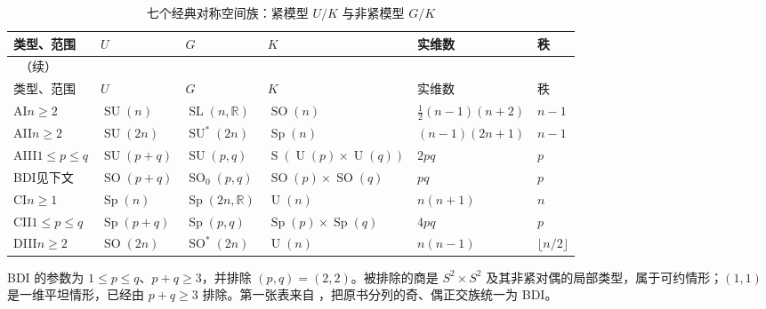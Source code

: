 \begingroup
\small
\setlength{\tabcolsep}{3pt}
\begin{longtable}{@{}p{}p{}p{}p{}p{}p{}@{}}
	\caption{七个经典对称空间族：紧模型 \(U/K\) 与非紧模型 \(G/K\)}\label{g3:tab:classical-symmetric-spaces}\\
	\toprule
	类型、范围 & \(U\) & \(G\) & \(K\) & 实维数 & 秩\\
	\midrule
	\endfirsthead
	\multicolumn{6}{l}{\thetable\ （续）}\\
	\toprule
	类型、范围 & \(U\) & \(G\) & \(K\) & 实维数 & 秩\\
	\midrule
	\endhead
	\bottomrule
	\endfoot
	AI\newline \(n\ge2\) & \(\operatorname{SU}(n)\) & \(\operatorname{SL}(n,\mathbb R)\) & \(\operatorname{SO}(n)\) & \(\tfrac12(n-1)(n+2)\) & \(n-1\)\\[3pt]
	AII\newline \(n\ge2\) & \(\operatorname{SU}(2n)\) & \(\operatorname{SU}^*(2n)\) & \(\operatorname{Sp}(n)\) & \((n-1)(2n+1)\) & \(n-1\)\\[3pt]
	AIII\newline \(1\le p\le q\) & \(\operatorname{SU}(p+q)\) & \(\operatorname{SU}(p,q)\) & \(\operatorname S(\operatorname U(p)\times\operatorname U(q))\) & \(2pq\) & \(p\)\\[3pt]
	BDI\newline 见下文 & \(\operatorname{SO}(p+q)\) & \(\operatorname{SO}_0(p,q)\) & \(\operatorname{SO}(p)\times\operatorname{SO}(q)\) & \(pq\) & \(p\)\\[3pt]
	CI\newline \(n\ge1\) & \(\operatorname{Sp}(n)\) & \(\operatorname{Sp}(2n,\mathbb R)\) & \(\operatorname U(n)\) & \(n(n+1)\) & \(n\)\\[3pt]
	CII\newline \(1\le p\le q\) & \(\operatorname{Sp}(p+q)\) & \(\operatorname{Sp}(p,q)\) & \(\operatorname{Sp}(p)\times\operatorname{Sp}(q)\) & \(4pq\) & \(p\)\\[3pt]
	DIII\newline \(n\ge2\) & \(\operatorname{SO}(2n)\) & \(\operatorname{SO}^*(2n)\) & \(\operatorname U(n)\) & \(n(n-1)\) & \(\lfloor n/2\rfloor\)\\
\end{longtable}
\endgroup

BDI 的参数为 \(1\le p\le q\)、\(p+q\ge3\)，并排除 \((p,q)=(2,2)\)。被排除的商是 \(S^2\times S^2\) 及其非紧对偶的局部类型，属于可约情形；\((1,1)\) 是一维平坦情形，已经由 \(p+q\ge3\) 排除。第一张表来自 \cite[第VII章第2节，第100--120页，尤其第119页表4]{Loos1969SymmetricII}，把原书分列的奇、偶正交族统一为 BDI。

